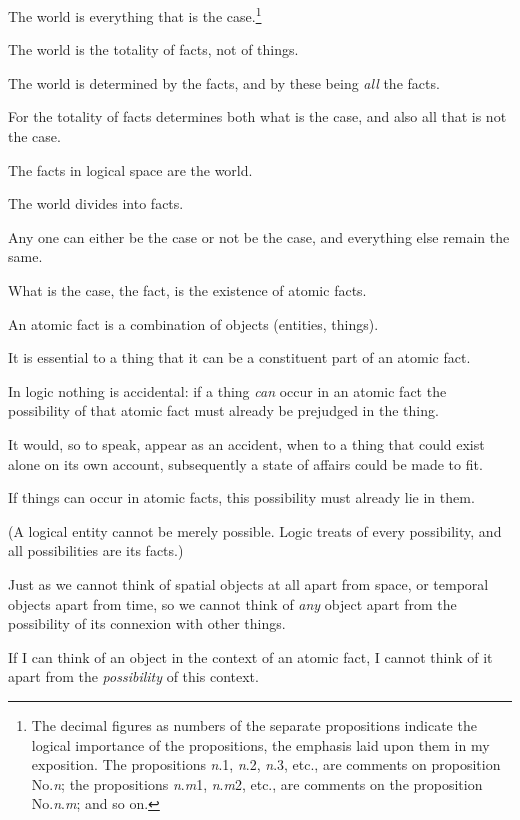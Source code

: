 {The world is everything that is the case.\footnote{The decimal figures as numbers of the separate propositions indicate the logical
importance of the propositions, the emphasis laid upon them in my exposition.
The propositions \textit{n}.1, \textit{n}.2, \textit{n}.3, etc., are comments on proposition No.\textit{n}; the propositions
\textit{n}.\textit{m}1, \textit{n}.\textit{m}2, etc., are comments on the proposition No.\textit{n}.\textit{m}; and so on.}}


{The world is the totality of facts, not of
things.}


{The world is determined by the facts, and by
these being \emph{all} the facts.}


{For the totality of facts determines both what is
the case, and also all that is not the case.}


{The facts in logical space are the world.}


{The world divides into facts.}


{Any one can either be the case or not be the
case, and everything else remain the same.}


{What is the case, the fact, is the existence of
atomic facts.}


{An atomic fact is a combination of objects
(entities, things).}


{It is essential to a thing that it can be a constituent
part of an atomic fact.}


{In logic nothing is accidental: if a thing \emph{can}
occur in an atomic fact the possibility of that
atomic fact must already be prejudged in the
thing.}


{It would, so to speak, appear as an accident, when
to a thing that could exist alone on its own account,
subsequently a state of affairs could be made to fit.

If things can occur in atomic facts, this possibility
must already lie in them.

(A logical entity cannot be merely possible.
Logic treats of every possibility, and all possibilities
are its facts.)

Just as we cannot think of spatial objects at
all apart from space, or temporal objects apart
from time, so we cannot think of \emph{any} object apart
from the possibility of its connexion with other
things.

If I can think of an object in the context of an
atomic fact, I cannot think of it apart from the
\emph{possibility} of this context.}


